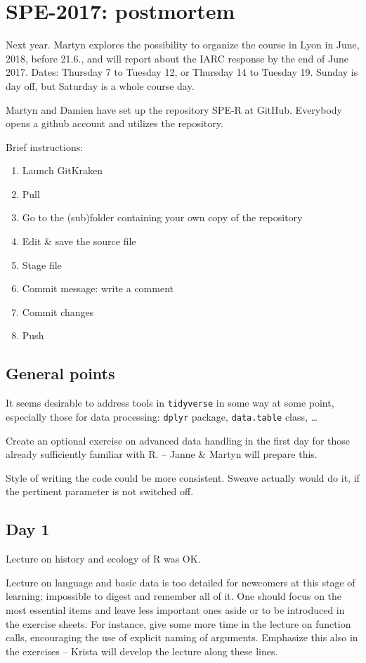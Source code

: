 \documentclass[11pt,a4]{article}
\begin{document}
\section*{SPE-2017: postmortem}

Next year. Martyn explores the possibility to organize the course 
 in Lyon in June, 2018, before 21.6., and will report about the 
IARC response by the end of June 2017.
Dates: Thursday 7 to Tuesday 12, or Thursday 14 to Tuesday 19.
Sunday is day off, but Saturday is a whole course day. 
 
Martyn and Damien have set up the repository SPE-R at GitHub.
Everybody opens a github account and utilizes the repository.

Brief instructions:
\begin{enumerate}
\item Launch GitKraken
\item Pull
\item Go to the (sub)folder containing your own copy of the repository
\item Edit \& save the source file
\item Stage file
\item Commit message: write a comment
\item Commit changes
\item Push
\end{enumerate}

\subsection*{General points}

It seems desirable to address tools in {\tt tidyverse} in some way at some point, 
especially those for data processing:
 {\tt dplyr} package, {\tt data.table} class, \dots

Create an optional exercise on advanced data handling 
in the first day for those already sufficiently familiar with R. -- Janne \& Martyn will
prepare this.

Style of writing the code could be more consistent. Sweave actually would do it,
if the pertinent parameter is not switched off.  

\subsection*{Day 1}

Lecture on history and ecology of R was OK. 

Lecture on language and basic data 
is too detailed for newcomers at this stage of learning; 
impossible to digest and remember all of it. 
One should focus on the most essential items and leave less important ones aside or to be introduced in the exercise sheets.
For instance, give some more time in the lecture on function calls, encouraging the use
of explicit naming of arguments. Emphasize this also in the exercises -- Krista
will develop the lecture along these lines.
\end{document}

